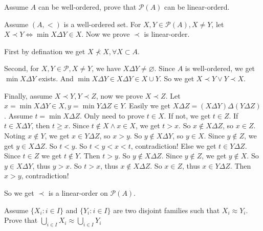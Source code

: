 \documentclass{ctexart}
\newif\ifpreface
\begin{document}
\large
\setlength{\baselineskip}{1.2em}
\ifpreface
	
\else
	\maketitle
\fi
{}
\begin{problem}
Assume \(A\) can be well-ordered, prove that \(\mathcal{P}(A)\) can be linear-orderd.
\end{problem}
\begin{solution}
	Assume \((A,<)\) is a well-ordered set.
	For \(X,Y \in \mathcal{P}(A),X \neq Y\), let \(X \prec Y \iff \min X \Delta Y \in X\). Now we prove \(\prec\) is linear-order.

	First by defination we get \(X \not \prec X,\forall X \subset A\).

	Second, for \(X,Y \in \mathcal{P},X \neq Y\), we have \(X \Delta Y \neq \varnothing\).
	Since \(A\) is well-ordered, we get \(\min X \Delta Y\) exists.
	And \(\min X \Delta Y \in X \Delta Y \in X \cup Y\).
	So we get \(X \prec Y \vee Y \prec X\).

	Finally, assume \(X \prec Y,Y \prec Z\), now we prove \(X \prec Z\).
	Let \(x = \min X \Delta Y \in X,y=\min Y \Delta Z \in Y\).
	Easily we get \(X \Delta Z = (X \Delta Y)\Delta (Y \Delta Z)\).
	Assume \(t = \min X \Delta Z\). Only need to prove \(t \in X\). If not, we get \(t \in Z\).
	If \(t \in X \Delta Y\), then \(t \geq x\). Since \(t \notin X \wedge x \in X\), we get \(t>x\).
	So \(x \notin X \Delta Z\), so \(x \in Z\). Noting \(x \notin Y\), we get \(x \in Y \Delta Z\), so \(x >y\).
	So \(y \notin X \Delta Y\), so \(y \in X\). Since \(y \notin Z\), we get \(y \in X \Delta Z\).
	So \(t<y\). So \(t<y<x<t\), contradiction!
	Else we get \(t \in Y \Delta Z\). Since \(t \in Z\) we get \(t \notin Y\). Then \(t>y\).
	So \(y \notin X \Delta Z\). Since \(y \notin Z\), we get \(y \notin X\).
	So \(y \in X \Delta Y\), thus \(y>x\). So \(t>x\), thus \(x \notin X \Delta Z\).
	So \(x \in Z\), thus \(x \in Y \Delta Z\). Then \(x > y\), contradiction!

	So we get \(\prec\) is a linear-order on \(\mathcal{P}(A)\).
\end{solution}

\begin{problem}
Assume \(\{X_i:i \in I\}\) and \(\{Y_i:i \in I\}\) are two disjoint families such that \(X_i \approx Y_i\).
Prove that \(\bigcup_{i \in I}X_i \approx \bigcup_{ i \in I} Y_i\)
\end{problem}
\end{document}
